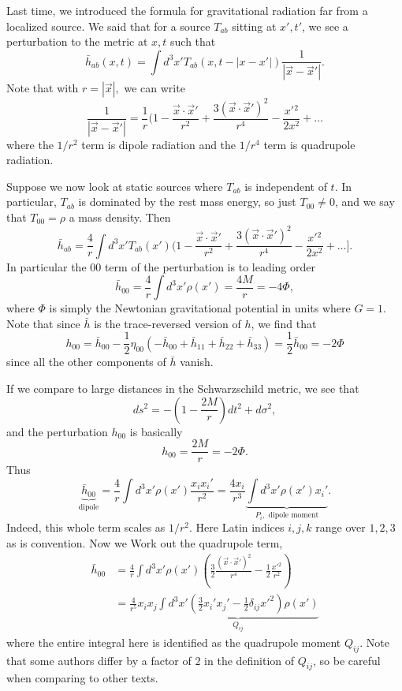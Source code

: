 Last time, we introduced the formula for gravitational radiation far from a localized source. We said that for a source $T_{ab}$ sitting at $x',t'$, we see a perturbation to the metric at $x,t$ such that
$$\bar h_{ab}(x,t)=\int d^3 x' T_{ab}(x,t-|x-x'|)\frac{1}{|\vec x- \vec x '|}.$$
Note that with $r=|\vec x|,$ we can write
$$\frac{1}{|\vec x-\vec x'|}=\frac{1}{r}(1-\frac{\vec x \cdot \vec x'}{r^2}+\frac{3(\vec x \cdot \vec x')^2}{r^4}-\frac{x'{}^2}{2x^2}+\ldots$$
where the $1/r^2$ term is dipole radiation and the $1/r^4$ term is quadrupole radiation.

Suppose we now look at static sources where $T_{ab}$ is independent of $t$. In particular, $T_{ab}$ is dominated by the rest mass energy, so just $T_{00}\neq 0$, and we say that $T_{00}=\rho$ a mass density. Then
$$\bar h_{ab}=\frac{4}{r}\int d^3 x' T_{ab}(x')(1-\frac{\vec x \cdot \vec x'}{r^2}+\frac{3(\vec x \cdot \vec x')^2}{r^4}-\frac{x'{}^2}{2x^2}+\ldots].$$
In particular the $00$ term of the perturbation is to leading order
$$\bar h_{00}=\frac{4}{r}\int d^3x' \rho(x')=\frac{4M}{r}=-4\Phi,$$
where $\Phi$ is simply the Newtonian gravitational potential in units where $G=1$. Note that since $\bar h$ is the trace-reversed version of $h$, we find that
$$h_{00}=\bar h_{00}-\frac{1}{2}\eta_{00}(-\bar h_{00}+\bar h_{11}+\bar h_{22}+\bar h_{33})=\frac{1}{2}\bar h_{00}=-2\Phi$$
since all the other components of $\bar h$ vanish.

If we compare to large distances in the Schwarzschild metric, we see that
$$ds^2=-\left(1-\frac{2M}{r}\right)dt^2+d\sigma^2,$$
and the perturbation $h_{00}$ is basically
$$h_{00}=\frac{2M}{r}=-2\Phi.$$
Thus
$$\underbrace{\bar h_{00}}_{\text{dipole}}=\frac{4}{r}\int d^3 x' \rho(x')\frac{x_i x_i'}{r^2}= \frac{4x_i}{r^3}\underbrace{\int d^3x' \rho(x')x_i'}_{P_i,\text{ dipole moment}}.$$
Indeed, this whole term scales as $1/r^2$. Here Latin indices $i,j,k$ range over $1,2,3$ as is convention. Now we Work out the quadrupole term,
\begin{align*}
    \bar h_{00}&=\frac{4}{r}\int d^3 x' \rho(x')\left(\frac{3}{2}\frac{(\vec x \cdot \vec x')^2}{r^4}-\frac{1}{2} \frac{x'{}^2}{r^2}\right)\\
    &=\frac{4}{r^5} x_i x_j \underbrace{\int d^3 x'\left(\frac{3}{2}x_i' x_j' -\frac{1}{2}\delta_{ij}x'^2\right)\rho(x')}_{Q_{ij}}
\end{align*}
where the entire integral here is identified as the quadrupole moment $Q_{ij}$. Note that some authors differ by a factor of $2$ in the definition of $Q_{ij}$, so be careful when comparing to other texts.

